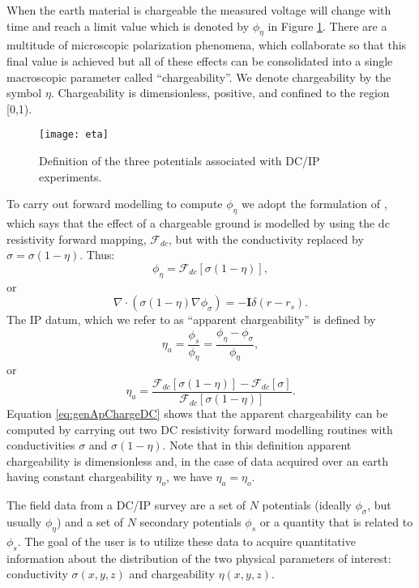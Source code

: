 When the earth material is chargeable the measured voltage will change with time and reach a limit value which is denoted by $\phi_\eta$ in Figure \ref{fig:basicTime}. There are a multitude of microscopic polarization phenomena, which collaborate so that this final value is achieved but all of these effects can be consolidated into a single macroscopic parameter called ``chargeability''. We denote chargeability by the symbol $\eta$. Chargeability is dimensionless, positive, and confined to the region [0,1). 
%
\begin{figure}
\centering
\texttt{[image: eta]}
\caption{Definition of the three potentials associated with DC/IP experiments.}
\label{fig:basicTime}
\end{figure}
%

To carry out forward modelling to compute $\phi_\eta$ we adopt the formulation of \citet{Siegel59}, which says that the effect of a chargeable ground is modelled by using the dc resistivity forward mapping, $\mathcal{F}_{dc}$, but with the conductivity replaced by $\sigma = \sigma(1-\eta)$. Thus:
%
\begin{equation}
\label{eq:phiEta}
\phi_\eta = \mathcal{F}_{dc}[\sigma(1-\eta)],
\end{equation}
%
or 
%
\begin{equation}
\label{eq:ipForward}
\nabla \cdot (\sigma(1-\eta)\nabla\phi_\sigma) = - \mathbf{I}\delta(r-r_s).
\end{equation}
%
The IP datum, which we refer to as ``apparent chargeability'' is defined by
%
\begin{equation}
\eta_a = \frac{\phi_s}{\phi_\eta} = \frac{\phi_\eta - \phi_\sigma}{\phi_\eta},
\label{eq:genApCharge}
\end{equation}
%
or
%
\begin{equation}
\eta_a = \frac{\mathcal{F}_{dc}[\sigma(1-\eta)] - \mathcal{F}_{dc}[\sigma]}{\mathcal{F}_{dc}[\sigma(1-\eta)]}.
\label{eq:genApChargeDC}
\end{equation}
%
Equation \ref{eq:genApChargeDC} shows that the apparent chargeability can be computed by carrying out two DC resistivity forward modelling routines with conductivities $\sigma$ and $\sigma(1-\eta)$. Note that in this definition apparent chargeability is dimensionless and, in the case of data acquired over an earth having constant chargeability $\eta_o$, we have $\eta_a = \eta_o$.

The field data from a DC/IP survey are a set of $N$ potentials (ideally $\phi_\sigma$, but usually $\phi_\eta$) and a set of $N$ secondary potentials $\phi_s$ or a quantity that is related to $\phi_s$. The goal of the user is to utilize these data to acquire quantitative information about the distribution of the two physical parameters of interest: conductivity $\sigma(x,y,z)$ and chargeability $\eta(x,y,z)$.

